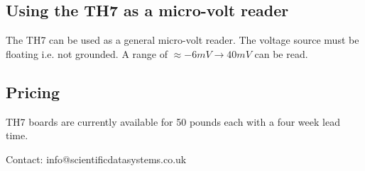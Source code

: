 \documentclass[10pt,foldmark]{leaflet}
\begin{document}
\subsection{Using the TH7 as a micro-volt reader}

The TH7 can be used as a general micro-volt reader.
The voltage source must be floating i.e. not grounded.
A range of $\approx -6mV \rightarrow 40mV$ can be read.
\clearpage
\subsection{Pricing}

TH7 boards are currently available for 50 pounds each with a four week lead time.
\vspace{3.5cm}
\mbox{}
\vfill
{}

\vspace{0.5cm}
Contact: info@scientificdatasystems.co.uk
\end{document}
